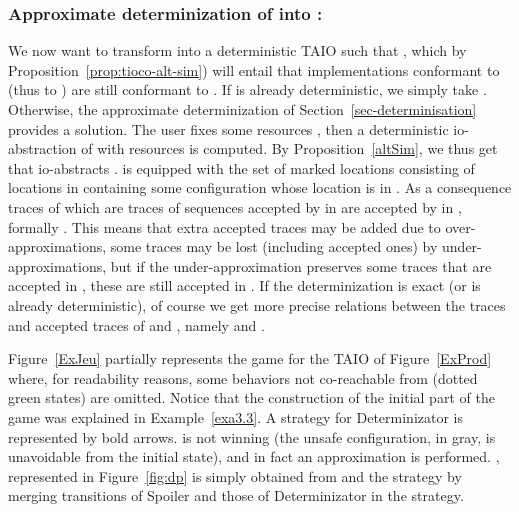 \documentclass{LMCS}
\theoremstyle{plain}\newtheorem{proposition}[thm]{Proposition}
\begin{document}
\subsubsection*{Approximate determinization of  into :}
We now want to transform  into a deterministic TAIO 
such that , which  by Proposition~\ref{prop:tioco-alt-sim})
will entail that implementations conformant to  (thus to ) 
are still conformant to . 
If  is already deterministic, we simply take .
Otherwise, 
the approximate determinization of Section~\ref{sec-determinisation} provides a solution.
The user fixes some resources ,
then a deterministic io-abstraction   of  with  resources  is computed.
By Proposition~\ref{altSim}, we thus get that   io-abstracts .
 is equipped with the set of marked locations 
consisting of locations in  containing some configuration
whose location is in . 
As a consequence traces of  which are traces of sequences accepted by  
in  are accepted by  in ,  formally 
.
This means that extra accepted traces may be added due to over-approximations, 
some traces may be lost (including accepted ones) 
by under-approximations, but if the under-approximation preserves
some traces that are accepted in , these are still accepted in .   
If the determinization is exact (or  is already deterministic), 
of course we get more precise relations between the traces and accepted traces of  and ,
namely
  and
.  



\begin{exa}
Figure~\ref{ExJeu}
partially represents the game  for the TAIO  of Figure~\ref{ExProd} where,
for readability reasons, some behaviors not co-reachable from
 (dotted green states) are omitted.
Notice that the construction of the initial part of the game was explained  
in Example~\ref{exa3.3}.
A strategy  for Determinizator is represented by bold arrows.
 is not winning (the unsafe configuration, in gray, is unavoidable from the initial state), 
and in fact an approximation is performed.
, represented in Figure~\ref{fig:dp} 
is simply obtained from  and the strategy  
by merging transitions of Spoiler and those of Determinizator in the strategy.
\end{exa}
\end{document}
